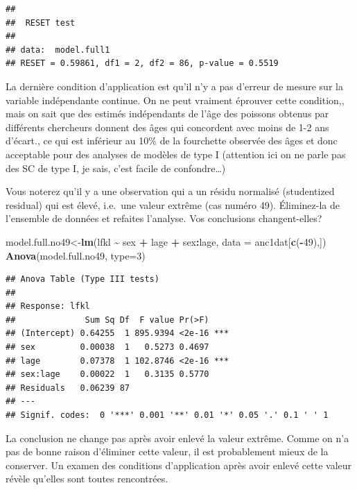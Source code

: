 \documentclass[
  12pt,
]{book}
\newenvironment{Shaded}{\begin{snugshade}}{\end{snugshade}}
\newcommand{\DataTypeTok}[1]{\textcolor[rgb]{0.13,0.29,0.53}{#1}}
\newcommand{\DecValTok}[1]{\textcolor[rgb]{0.00,0.00,0.81}{#1}}
\newcommand{\KeywordTok}[1]{\textcolor[rgb]{0.13,0.29,0.53}{\textbf{#1}}}
\newcommand{\NormalTok}[1]{#1}
\newcommand{\OperatorTok}[1]{\textcolor[rgb]{0.81,0.36,0.00}{\textbf{#1}}}
\newcommand{\StringTok}[1]{\textcolor[rgb]{0.31,0.60,0.02}{#1}}
\begin{document}
\begin{verbatim}
## 
##  RESET test
## 
## data:  model.full1
## RESET = 0.59861, df1 = 2, df2 = 86, p-value = 0.5519
\end{verbatim}

La dernière condition d'application est qu'il n'y a pas d'erreur de mesure sur la variable indépendante continue. On ne peut vraiment éprouver cette condition,, mais on sait que des estimés indépendants de l'âge des poissons obtenus par différents chercheurs donnent des âges qui concordent avec moins de 1-2 ans d'écart., ce qui est inférieur au 10\% de la fourchette observée des âges et donc acceptable pour des analyses de modèles de type I (attention ici on ne parle pas des SC de type I, je sais, c'est facile de confondre\ldots)

Vous noterez qu'il y a une observation qui a un résidu normalisé (studentized residual) qui est élevé, i.e.~une valeur extrême (cas numéro 49). Éliminez-la de l'ensemble de données et refaites l'analyse. Vos conclusions changent-elles?

\begin{Shaded}
\begin{Highlighting}[]
\NormalTok{model.full.no49\textless{}{-}}\KeywordTok{lm}\NormalTok{(lfkl }\OperatorTok{\textasciitilde{}}\StringTok{ }\NormalTok{sex }\OperatorTok{+}\StringTok{ }\NormalTok{lage }\OperatorTok{+}\StringTok{ }\NormalTok{sex}\OperatorTok{:}\NormalTok{lage, }\DataTypeTok{data =}\NormalTok{ anc1dat[}\KeywordTok{c}\NormalTok{(}\OperatorTok{{-}}\DecValTok{49}\NormalTok{),])}
\KeywordTok{Anova}\NormalTok{(model.full.no49, }\DataTypeTok{type=}\DecValTok{3}\NormalTok{)}
\end{Highlighting}
\end{Shaded}

\begin{verbatim}
## Anova Table (Type III tests)
## 
## Response: lfkl
##              Sum Sq Df  F value Pr(>F)    
## (Intercept) 0.64255  1 895.9394 <2e-16 ***
## sex         0.00038  1   0.5273 0.4697    
## lage        0.07378  1 102.8746 <2e-16 ***
## sex:lage    0.00022  1   0.3135 0.5770    
## Residuals   0.06239 87                    
## ---
## Signif. codes:  0 '***' 0.001 '**' 0.01 '*' 0.05 '.' 0.1 ' ' 1
\end{verbatim}

La conclusion ne change pas après avoir enlevé la valeur extrême. Comme on n'a pas de bonne raison d'éliminer cette valeur, il est probablement mieux de la conserver. Un examen des conditions d'application après avoir enlevé cette valeur révèle qu'elles sont toutes rencontrées.
\end{document}
